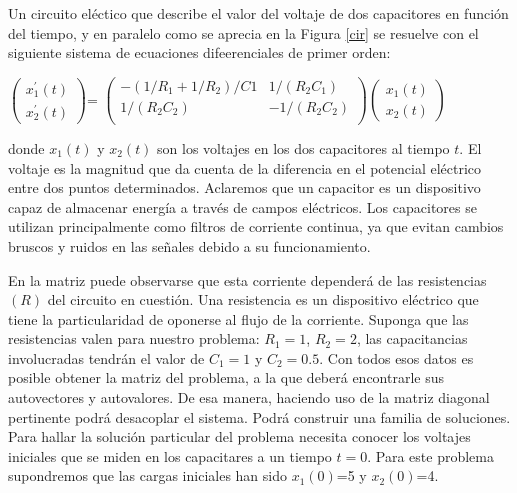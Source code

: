 \begin{answers}

	Un circuito eléctico que describe el valor del voltaje de dos capacitores en función del tiempo, y en paralelo como se aprecia en la Figura \ref{cir} se resuelve con el siguiente sistema de ecuaciones difeerenciales  de primer orden:
 
\bigskip
 
	
	$ \left(\begin{array}{c} x^{\prime}_1(t)  \\ x^{\prime}_2(t
 
 ) 
\end{array}
 \right)$= $\left(\begin{array}{cc} -(1/R_1 + 1/R_2)/C1 & 1/(R_2C_1)\\1/(R_2C_2) & -1/(R_2C_2)\\
 \end{array}
 \right)$$ \left(\begin{array}{c} x_1(t)\\x_2(t)
\end{array}
 \right)$

 \bigskip
 
 
	\bigskip
 
	\noindent donde $x_1(t)$ y $x_2(t)$ son los voltajes en los dos capacitores al tiempo $t$. El voltaje es la magnitud que da cuenta de la diferencia en el potencial eléctrico entre dos puntos determinados. Aclaremos que un capacitor es un dispositivo capaz de almacenar energía a través de campos eléctricos. Los capacitores se utilizan principalmente como filtros de corriente continua, ya que evitan cambios bruscos y ruidos en las señales debido a su funcionamiento. 
 
 En la matriz puede observarse que esta corriente dependerá de las resistencias $(R)$ del circuito en cuestión. Una resistencia  es un dispositivo eléctrico que tiene la particularidad de oponerse al flujo de la corriente. Suponga que las resistencias valen para nuestro problema: $R_1=1$, $R_2=2$, las capacitancias involucradas tendrán el valor de $C_1= 1$ y $C_2=0.5$. Con todos esos datos es posible  obtener  la matriz del problema, a la que deberá encontrarle sus autovectores y autovalores. De esa manera, haciendo uso de la matriz diagonal pertinente podrá desacoplar el sistema. Podrá construir una familia de soluciones.  Para hallar la solución particular del problema necesita conocer los voltajes iniciales que se miden en los capacitares  a un tiempo $t=0$. Para este problema supondremos que las cargas iniciales han sido $x_1(0)$=5 y $x_2(0)$=4.
 

\end{answers}
